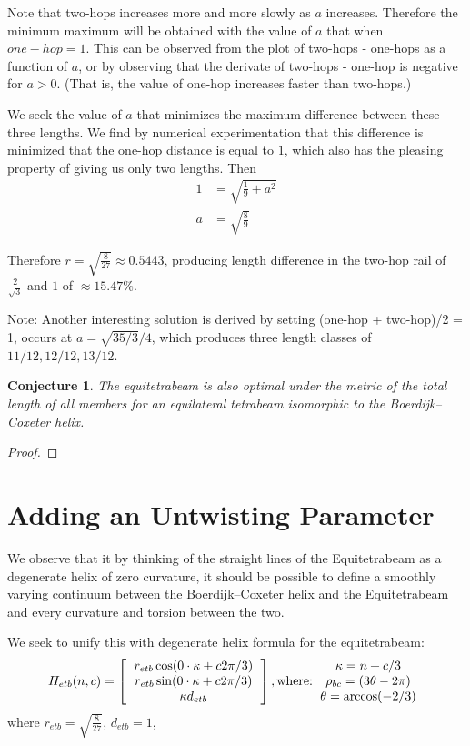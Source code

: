 \documentclass[11pt]{article}
\newtheorem{conjecture}{Conjecture}
\begin{document}
Note that two-hops increases more and more slowly as $a$ increases. Therefore the minimum maximum will
be obtained with the value of $a$ that when $one-hop = 1$. This can be observed from the
plot of two-hops - one-hops as a function of $a$, or by observing that the derivate of two-hops - one-hop
is negative for $a > 0$. (That is, the value of one-hop increases faster than two-hops.) 

We seek the value of $a$ that minimizes the maximum difference between these three lengths. We find
by numerical experimentation that this difference is minimized that the one-hop distance is equal to $1$,
which also has the pleasing property of giving us only two lengths. Then
\begin{align*}
   1  &=  \sqrt{\frac{1}{9} + a^2} \\
     a  &= \sqrt{\frac{8}{9}} 
\end{align*}

Therefore $ r = \sqrt{\frac{8}{27}} \approx 0.5443 $, producing length difference in the two-hop rail of
$\frac{2}{\sqrt{3}}$
and $1$ of $\approx 15.47\% $.

Note: Another interesting solution is derived by setting (one-hop + two-hop)/2 = 1,  occurs at $a = \sqrt{35/3}/4$,
which produces three length classes of $11/12, 12/12, 13/12$.

\begin{conjecture}
  The equitetrabeam is also optimal under the metric of the total length of all members 
  for an equilateral tetrabeam isomorphic to the Boerdijk--Coxeter helix.
\end{conjecture}

\begin{proof}
  
\end{proof}


\section{Adding an Untwisting Parameter}

We observe that it by thinking of the straight lines of the Equitetrabeam as a degenerate helix of zero curvature,
it should be possible to define a smoothly varying continuum between the Boerdijk--Coxeter helix and the Equitetrabeam and every
curvature and torsion between the two.

We seek to unify this with degenerate helix formula for the equitetrabeam:
\[
H_{etb}(n,c) =
\left [
  \begin{tabular}{c}
   $ r_{etb}  \cos( 0 \cdot \kappa  + c 2 \pi /3) $\\
   $ r_{etb}  \sin( 0 \cdot \kappa  + c 2 \pi /3) $\\
   $ \kappa d_{etb} $
  \end{tabular}
\right ],
\text{where:}
  \begin{tabular}{c}
 $\kappa = n + c/3$ \\
    $\rho_{bc} = (3 \theta - 2 \pi)$ \\
   $ \theta = \arccos(-2/3) $
  \end{tabular}      
\]
where $ r_{etb} = \sqrt{\frac{8}{27}}$, $d_{etb} = 1$,
\end{document}
